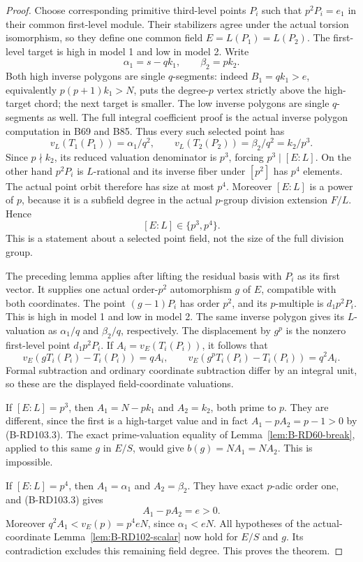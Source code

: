 \begin{proof}
Choose corresponding primitive third-level points $P_i$
such that $p^2P_i=e_1$ in their common first-level module.
Their stabilizers agree under the actual torsion isomorphism,
so they define one common field
$E=L(P_1)=L(P_2)$.
The first-level target is high in model 1 and low in model 2.
Write
\[
       \alpha_1=s-qk_1,\qquad\beta_2=pk_2 .
                                                        \tag{B-RD103.4}
\]
Both high inverse polygons are single $q$-segments: indeed
$B_1=qk_1>e$, equivalently
$p(p+1)k_1>N$, puts the degree-$p$ vertex strictly above
the high-target chord; the next target is smaller.
The low inverse polygons are single $q$-segments as well.
The full integral coefficient proof is the actual inverse
polygon computation in B69 and B85.
Thus every such selected point has
\[
 v_L(T_1(P_1))=\alpha_1/q^2,\qquad
 v_L(T_2(P_2))=\beta_2/q^2=k_2/p^3 .
                                                        \tag{B-RD103.5}
\]
Since $p\nmid k_2$, its reduced valuation denominator is
$p^3$, forcing $p^3\mid[E:L]$.
On the other hand $p^2P_i$ is $L$-rational and its inverse
fiber under $[p^2]$ has $p^4$ elements. The actual point
orbit therefore has size at most $p^4$.
Moreover $[E:L]$ is a power of $p$, because it is a
subfield degree in the actual $p$-group division extension
$F/L$. Hence
\[
                         [E:L]\in\{p^3,p^4\}.           \tag{B-RD103.6}
\]
This is a statement about a selected point field, not the
size of the full division group.

The preceding lemma applies after lifting the residual
basis with $P_i$ as its first vector. It supplies one
actual order-$p^2$ automorphism $g$ of $E$, compatible
with both coordinates. The point $(g-1)P_i$ has order
$p^2$, and its $p$-multiple is $d_1p^2P_i$.
This is high in model 1 and low in model 2.
The same inverse polygon gives its $L$-valuation as
$\alpha_1/q$ and $\beta_2/q$, respectively.
The displacement by $g^p$ is the nonzero first-level
point $d_1p^2P_i$.
If $A_i=v_E(T_i(P_i))$, it follows that
\[
       v_E(gT_i(P_i)-T_i(P_i))=qA_i,\qquad
       v_E(g^pT_i(P_i)-T_i(P_i))=q^2A_i .
                                                        \tag{B-RD103.7}
\]
Formal subtraction and ordinary coordinate subtraction
differ by an integral unit, so these are the displayed
field-coordinate valuations.

If $[E:L]=p^3$, then
$A_1=N-pk_1$ and $A_2=k_2$, both prime to $p$.
They are different, since the first is a high-target
value and in fact
$A_1-pA_2=p-1>0$ by (B-RD103.3).
The exact prime-valuation equality of
Lemma~\ref{lem:B-RD60-break}, applied to this same $g$
in $E/S$, would give
$b(g)=NA_1=NA_2$. This is impossible.

If $[E:L]=p^4$, then $A_1=\alpha_1$ and $A_2=\beta_2$.
They have exact $p$-adic order one, and (B-RD103.3) gives
\[
                  A_1-pA_2=e>0 .
                                                        \tag{B-RD103.8}
\]
Moreover $q^2A_1<v_E(p)=p^4eN$, since $\alpha_1<eN$.
All hypotheses of the actual-coordinate
Lemma~\ref{lem:B-RD102-scalar} now hold for $E/S$ and $g$.
Its contradiction excludes this remaining field degree.
This proves the theorem.
\end{proof}

